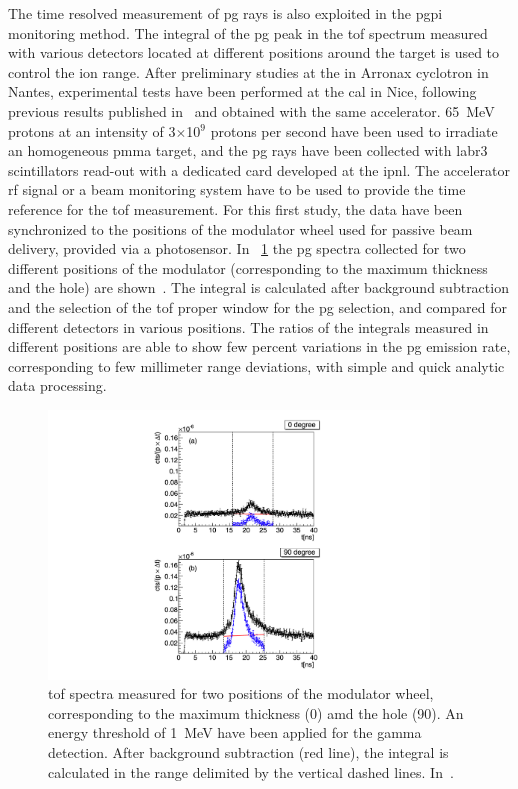 The time resolved measurement of \gls{pg} rays is also exploited in the \gls{pgpi} monitoring method. The integral of the \gls{pg} peak in the \gls{tof} spectrum measured with various detectors located at different positions around the target is used to control the ion range. After preliminary studies at the in Arronax cyclotron in Nantes, experimental tests have been performed at the \gls{cal} in Nice, following previous results published in~\cite{Carnicer2012} and obtained with the same accelerator. 65~MeV protons at an intensity of 3$\times$10$^9$ protons per second have been used to irradiate an homogeneous \gls{pmma} target, and the \gls{pg} rays have been collected with \gls{labr3} scintillators read-out with a dedicated card developed at the \gls{ipnl}. The accelerator \gls{rf} signal or a beam monitoring system have to be used to provide the time reference for the \gls{tof} measurement. For this first study, the data have been synchronized to the positions of the modulator wheel used for passive beam delivery, provided via a photosensor. In \figurename~\ref{chap2::fig::PGPI_spectra} the \gls{pg} spectra collected for two different positions of the modulator (corresponding to the maximum thickness and the hole) are shown~\parencite{Krimmer2017b}. The integral is calculated after background subtraction and the selection of the \gls{tof} proper window for the \gls{pg} selection, and compared for different detectors in various positions. The ratios of the integrals measured in different positions are able to show few percent variations in the \gls{pg} emission rate, corresponding to few millimeter range deviations, with simple and quick analytic data processing.

\begin{figure}[!htbp]
\centering
\includegraphics[width=0.9\textwidth]{03_GraphicFiles/chapter2_GammaCameras/PGPI_spectra.pdf}
\caption{\gls{tof} spectra measured for two positions of the modulator wheel, corresponding to the maximum thickness (0\textdegree) amd the hole (90\textdegree). An energy threshold of 1~MeV have been applied for the gamma detection. After background subtraction (red line), the integral is calculated in the range delimited by the vertical dashed lines. In~\cite{Krimmer2017}.}
\label{chap2::fig::PGPI_spectra}
\end{figure}  

